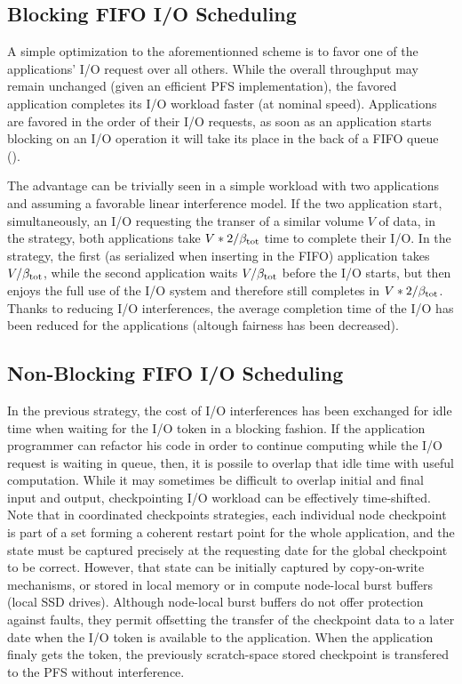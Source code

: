 \subsection{Blocking FIFO I/O Scheduling}

A simple optimization to the aforementionned scheme is to favor one of
the applications' I/O request over all others. While the overall throughput
may remain unchanged (given an efficient PFS implementation), the favored
application completes its I/O workload faster (\ie at nominal speed).
Applications are favored in the order of their I/O requests, \ie
as soon as an application starts blocking on an I/O operation it will
take its place in the back of a FIFO queue (\fifoblock).

The advantage can be trivially seen in a simple workload with two
applications and assuming a favorable linear interference model.
If the two application start, simultaneously, an I/O requesting the
transer of a similar volume $V$ of data, in the \nocoop strategy,
both applications take $V*2/\beta_{\text{tot}}$ time to complete their I/O.
In the \fifoblock strategy, the first (as serialized when inserting in
the FIFO) application takes $V/\beta_{\text{tot}}$, while the second application
waits $V/\beta_{\text{tot}}$ before the I/O starts, but then enjoys the full use of
the I/O system and therefore still completes in $V*2/\beta_{\text{tot}}$. Thanks
to reducing I/O interferences, the average completion time of the I/O
has been reduced for the applications (altough fairness has been decreased).

\subsection{Non-Blocking FIFO I/O Scheduling}

In the previous strategy, the cost of I/O interferences has been
exchanged for idle time when waiting for the I/O token in a blocking
fashion. If the application programmer can refactor his code in order
to continue computing while the I/O request is waiting in queue,
then, it is possile to overlap that idle time with useful computation.
While it may sometimes be difficult to overlap initial and final input
and output, checkpointing I/O workload can be effectively time-shifted.
Note that in coordinated checkpoints strategies, each individual node
checkpoint is part of a set forming a coherent restart point for the
whole application, and the state must be captured precisely at the
requesting date for the global checkpoint to be correct. However, that
 state can be initially captured by copy-on-write mechanisms, or stored
in local memory or in compute node-local burst buffers (\eg local SSD
drives). Although node-local burst buffers do not offer protection
against faults, they permit offsetting the transfer of the checkpoint
data to a later date when the I/O token is available to the application.
When the application finaly gets the token, the previously scratch-space
stored checkpoint is transfered to the PFS without interference.

